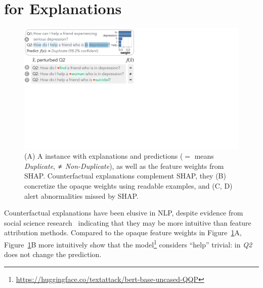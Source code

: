 
\newcommand{\fwone}[1]{\colbox{cfwone}{#1}\xspace}
\newcommand{\fwtwo}[1]{\colbox{cfwtwo}{#1}\xspace}
\newcommand{\fwthree}[1]{\colbox{cfwthree}{#1}\xspace}
\newcommand{\fwfour}[1]{\colbox{cfwfour}{#1}\xspace}

\newcommand{\fexp}[2]{\texttt{[{\color{darkgray}{#1:#2}}]}\xspace}
\newcommand{\fexptag}[1]{\fexp{TAG}{#1}}
\newcommand{\fexpfrom}[1]{\fexp{FROM}{#1}}
\newcommand{\fexpto}[1]{\fexp{TO}{#1}}
\newcommand{\fexptemp}[1]{\fexp{TEMP}{#1}}


\section{\sysname for Explanations}
\label{sec:app_explain}




\begin{figure}[t]
\centering
\includegraphics[trim={0 20cm 33cm 0cm},clip,width=1\columnwidth]{figures/explanation_v2.pdf}
\vspace{-15pt}
\caption{
(A) A \qqp instance with explanations and predictions ($\mathbf{=}$ means \emph{Duplicate}, $\mathbf{\not\eq}$ \emph{Non-Duplicate}), as well as the feature weights from SHAP.
Counterfactual explanations complement SHAP, \ie they (B) concretize the opaque weights using readable examples, and (C, D) alert abnormalities missed by SHAP.
}
\vspace{-10pt}
\label{fig:explanation}
\end{figure}

Counterfactual explanations have been elusive in NLP, despite evidence from social science research~\cite{miller} indicating that they may be more intuitive than feature attribution methods. 
Compared to the opaque feature weights in Figure~\ref{fig:explanation}A, Figure~\ref{fig:explanation}B more intuitively show that the \qqp model\footnote{\url{https://huggingface.co/textattack/bert-base-uncased-QQP}} considers ``help'' trivial: 
 in \emph{Q2} does not change the prediction.

